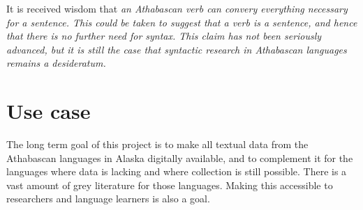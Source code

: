 \documentclass[a4paper,11pt]{article}
\begin{document}
It is received wisdom that \em an Athabascan verb can convery everything necessary for a sentence\em. This could be taken to suggest that \em a verb is a sentence\em, and hence that there is no further need for syntax. This claim has not been seriously advanced, but it is still the case that syntactic research in Athabascan languages remains a desideratum.


% 
% 

\section{Use case}
The long term goal of this project is to make all textual data from the Athabascan languages in Ala\-ska digitally available, and to complement it for the languages where data is lacking and where collection is still possible. 
There is a vast amount of grey literature for those languages. Making this accessible to researchers and language learners is also a goal.
\end{document}
